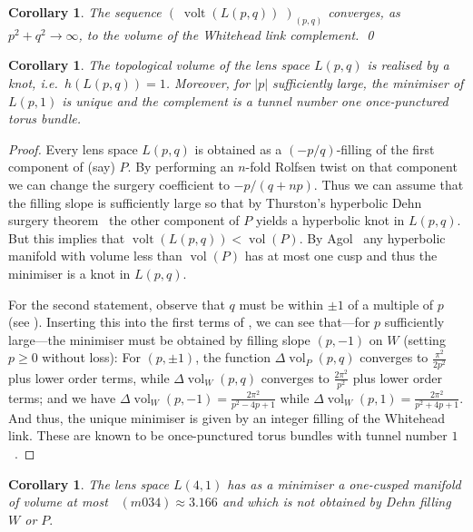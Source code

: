 \documentclass[a4paper]{gtart}
\newtheorem{corollary}[proposition]{Corollary}
\theoremstyle{definition}
\theoremstyle{remark}
\numberwithin{equation}{section}
\DeclareMathOperator{\vol}{vol}
\DeclareMathOperator{\volt}{volt}
\DeclareMathOperator{\volh}{vol_{\mathbb{H}}}
\begin{document}
\begin{corollary}
The sequence $(\;\volt(L(p,q))\;)_{(p,q)}$ converges, as $p^2+q^2\to\infty$, to the volume of the Whitehead link complement. \qed
\end{corollary}

\begin{corollary}
\label{cor:p-1}
The topological volume of the lens space $L(p,q)$ is realised by a knot, i.e.\ $h(L(p,q))=1$. Moreover, for $|p|$ sufficiently large, the minimiser of $L(p,1)$ is unique and the complement is a tunnel number one once-punctured torus bundle.
\end{corollary}

\begin{proof}
	Every lens space $L(p, q)$ is obtained as a $(-p/q)$-filling of the first component of (say) $P$. By performing an $n$-fold Rolfsen twist on that component we can change the surgery coefficient to $-p/(q+np)$. Thus we can assume that the filling slope is sufficiently large so that by Thurston's hyperbolic Dehn surgery theorem~\cite{Thurston_book} the other component of $P$ yields a hyperbolic knot in $L(p,q)$. But this implies that $\volt(L(p,q))<\vol(P)$. By Agol~\cite{agol-2cusped} any hyperbolic manifold with volume less than $\vol(P)$ has at most one cusp and thus the minimiser is a knot in $L(p,q)$.
  
  For the second statement, observe that $q$ must be within $\pm 1$ of a multiple of $p$ (see ). Inserting this into the first terms of , we can see that---for $p$ sufficiently large---the minimiser must be obtained by filling slope $(p, -1)$ on $W$ (setting $p\geq 0$ without loss): For $(p,\pm 1)$, the function $\Delta \vol_P (p,q)$ converges to $\frac{\pi^2}{2p^2}$ plus lower order terms, while $\Delta \vol_W (p,q)$ converges to $\frac{2\pi^2}{p^2}$ plus lower order terms; and we have $\Delta \vol_W (p,-1) = \frac{2\pi^2}{p^2 -4p + 1}$ while $\Delta \vol_W (p,1) = \frac{2\pi^2}{p^2 +4p + 1}$. And thus, the unique minimiser is given by an integer filling of the Whitehead link. These are known to be once-punctured torus bundles with tunnel number $1$~\cite[Theorem~1.3]{torus_bundles}.
\end{proof}

\begin{corollary}\label{cor:L4-is-special}
The lens space $L(4,1)$ has as a minimiser a one-cusped manifold of volume at most $\volh(m034)\approx 3.166$ and which is not obtained by Dehn filling $W$ or $P.$
\end{corollary}
\end{document}
